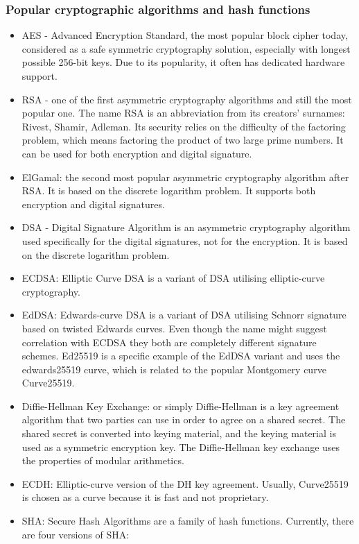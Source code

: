 \subsubsection{Popular cryptographic algorithms and hash functions}
\begin{itemize}
    \item AES - Advanced Encryption Standard, the most popular block cipher today, considered as a safe symmetric cryptography solution, especially with longest possible 256-bit keys. Due to its popularity, it often has dedicated hardware support.
    \item RSA - one of the first asymmetric cryptography algorithms and still the most popular one. The name RSA is an abbreviation from its creators' surnames: Rivest, Shamir, Adleman. Its security relies on the difficulty of the factoring problem, which means factoring the product of two large prime numbers. It can be used for both encryption and digital signature.
    \item ElGamal: the second most popular asymmetric cryptography algorithm after RSA. It is based on the discrete logarithm problem. It supports both encryption and digital signatures.
    \item DSA - Digital Signature Algorithm is an asymmetric cryptography algorithm used specifically for the digital signatures, not for the encryption. It is based on the discrete logarithm problem.
    \item ECDSA: Elliptic Curve DSA is a variant of DSA utilising elliptic-curve cryptography.
    \item EdDSA: Edwards-curve DSA is a variant of DSA utilising Schnorr signature based on twisted Edwards curves. Even though the name might suggest correlation with ECDSA they both are completely different signature schemes. Ed25519 is a specific example of the EdDSA variant and uses the edwards25519 curve, which is related to the popular Montgomery curve Curve25519. 
    \item Diffie-Hellman Key Exchange: or simply Diffie-Hellman is a key agreement algorithm that two parties can use in order to agree on a shared secret. The shared secret is converted into keying material, and the keying material is used as a symmetric encryption key. The Diffie-Hellman key exchange uses the properties of modular arithmetics.
    \item ECDH: Elliptic-curve version of the DH key agreement. Usually, Curve25519 is chosen as a curve because it is fast and not proprietary.
    \item SHA: Secure Hash Algorithms are a family of hash functions. Currently, there are four versions of SHA: \begin{enumerate}

\end{enumerate}
\end{itemize}
